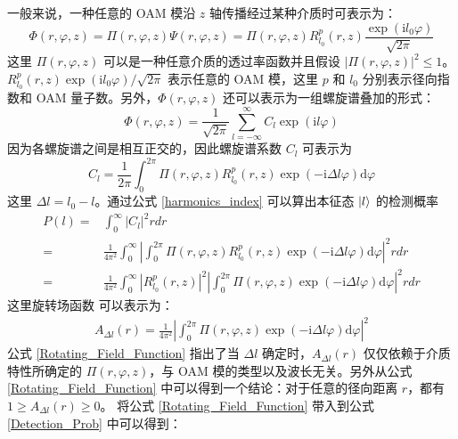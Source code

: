 \documentclass[master]{thesis-uestc}
\begin{document}
一般来说，一种任意的 OAM 模沿 $z$ 轴传播经过某种介质时可表示为：
\begin{equation}\label{OAM_mode_medium}
  \Phi(r,\varphi,z)=\Pi(r,\varphi,z)\Psi(r,\varphi,z)=\Pi(r,\varphi,z)R_{l_0}^p(r,z)\frac{\exp(\mathrm{i}l_0\varphi)}{\sqrt{2\pi}}
\end{equation}
\noindent 这里 $\Pi(r,\varphi,z)$ 可以是一种任意介质的透过率函数并且假设 $|\Pi(r,\varphi,z)|^2\leq 1$。 $R_{l_0}^p(r,z)\exp(\mathrm{i}l_0\varphi)/\sqrt{2\pi}$ 表示任意的 OAM 模，这里 $p$ 和 $l_0$ 分别表示径向指数和 OAM 量子数。另外，$\Phi(r,\varphi,z)$ 还可以表示为一组螺旋谱叠加的形式：
\begin{equation}\label{in_spiral_OAM_harmonics}
  \Phi(r,\varphi,z)=\frac{1}{\sqrt{2\pi}}\sum\limits_{l=-\infty}^\infty C_l\exp(\mathrm{i}l\varphi)
\end{equation}
\noindent 因为各螺旋谱之间是相互正交的，因此螺旋谱系数 $C_l$ 可表示为
\begin{equation}\label{harmonics_index}
  C_l=\frac{1}{2\pi}\int_0^{2\pi}\Pi(r,\varphi,z)R_{l_0}^p(r,z)\exp(-\mathrm{i}\Delta l\varphi)\mathrm{d}\varphi
\end{equation}
\noindent 这里 $\Delta l=l_0-l$。通过公式 \eqref{harmonics_index} 可以算出本征态 $\ket{l}$ 的检测概率
\begin{equation}\label{Detection_Prob}
 \begin{split}
 P(l)=& \int_0^{\infty}\left|C_l\right|^2rdr\\
     =&\frac{1}{4\pi^2}\int_0^{\infty}\left|\int_0^{2\pi}\Pi(r,\varphi,z)R_{l_0}^p(r,z)\exp(-\mathrm{i}\Delta l\varphi)\mathrm{d}\varphi\right|^2rdr\\
 =& \frac{1}{4\pi^2}\int_0^{\infty}\left|R_{l_0}^p(r,z)\right|^2\left|\int_0^{2\pi}\Pi(r,\varphi,z)\exp(-\mathrm{i}\Delta l\varphi)\mathrm{d}\varphi\right|^2rdr
 \end{split}
\end{equation}
\noindent 这里旋转场函数\citeup{} 可以表示为：
\begin{equation}\label{Rotating_Field_Function}
 \begin{split}
 A_{\Delta l}(r)=\frac{1}{4\pi^2}\left|\int_0^{2\pi}\Pi(r,\varphi,z)\exp(-\mathrm{i}\Delta l\varphi)\mathrm{d}\varphi\right|^2
 \end{split}
\end{equation}
\noindent 公式 \eqref{Rotating_Field_Function} 指出了当 $\Delta l$ 确定时，$A_{\Delta l}(r)$ 仅仅依赖于介质特性所确定的 $\Pi(r,\varphi,z)$，与 OAM 模的类型以及波长无关。另外从公式 \eqref{Rotating_Field_Function} 中可以得到一个结论：对于任意的径向距离 $r$，都有 $1\geq A_{\Delta l}(r)\geq 0$。 将公式 \eqref{Rotating_Field_Function} 带入到公式 \eqref{Detection_Prob} 中可以得到：
\end{document}
